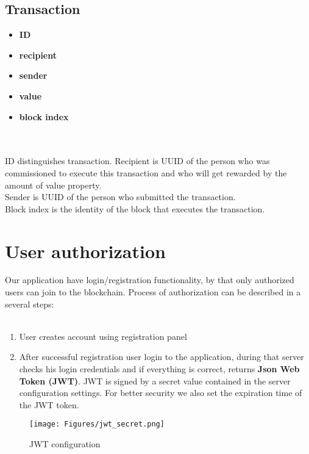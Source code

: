 \documentclass[
	letterpaper, %
	10pt, %
]{CSUniSchoolLabReport}
\begin{document}
\newpage
\subsection{Transaction}
\begin{itemize}
    \item \textbf{ID}
    \item \textbf{recipient}
	\item \textbf{sender}
    \item \textbf{value}
    \item \textbf{block index}
\end{itemize}
\\~\\
ID distinguishes transaction. Recipient is UUID of the person who was commissioned to execute this transaction and who will get rewarded by the amount of value property. 
\\ Sender is UUID of the person who submitted the transaction.
\\ Block index is the identity of the block that executes the transaction.

\section{User authorization}

Our application have login/registration functionality, by that only authorized users can join to the blockchain. Process of authorization can be described in a several steps:
\\~\\
\begin{enumerate}
\item User creates account using registration panel 
\item After successful registration user login to the application, during that server checks his login credentials and if everything is correct, returns \textbf{Json Web Token (JWT)}. JWT is signed by a secret value contained in the server configuration settings. For better security we also set the expiration time of the JWT token.
\end{enumerate}

\begin{figure}[hbt!]
    \centering
    \texttt{[image: Figures/jwt\_secret.png]}
    \caption{JWT configuration}
\end{figure}
\end{document}
